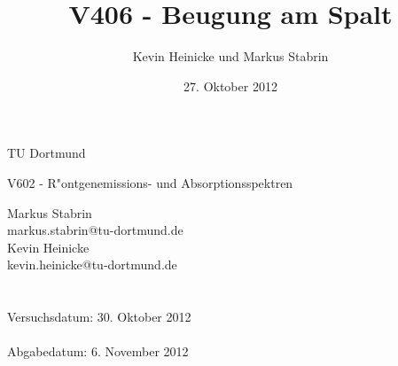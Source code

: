 \documentclass{scrartcl}
\title{V406 - Beugung am Spalt}
\date{27. Oktober 2012}
\author{Kevin Heinicke und Markus Stabrin}
\begin{document}
	
	\vspace*{3cm}

	\begin{center}
		\large
		TU Dortmund
	\end{center}

	\begin{center}
		\Huge
		V602 - R"ontgenemissions- und Absorptionsspektren
	\end{center}

	\vspace{6cm}
	\begin{center}
		\begin{minipage}[b]{8cm}
			\Large
			Markus Stabrin \\
			\normalsize
			markus.stabrin@tu-dortmund.de \\

			\Large
			Kevin Heinicke\\
			\normalsize
			kevin.heinicke@tu-dortmund.de \\
			\\
			\\

			Versuchsdatum: 30. Oktober 2012 \\
			\\
			Abgabedatum: 6. November 2012
		\end{minipage}
	\end{center}

	\newpage

	

	

	

	
\end{document}
